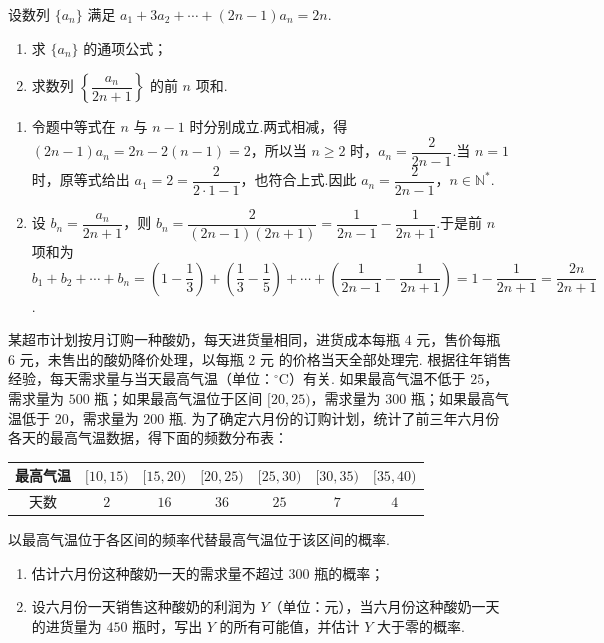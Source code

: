 \begin{problem}
设数列 \(\{a_n\}\) 满足 \(a_1+3a_2+\cdots+(2n-1)a_n=2n\).

\begin{enumerate}
\item 求 \(\{a_n\}\) 的通项公式；
\item 求数列 \(\left\{\dfrac{a_n}{2n+1}\right\}\) 的前 \(n\) 项和.
\end{enumerate}
\end{problem}

\begin{solution}
\begin{enumerate}
\item 令题中等式在 \(n\) 与 \(n-1\) 时分别成立.两式相减，得
\( (2n-1)a_n=2n-2(n-1)=2\)，所以当 \(n\geq2\) 时，\(a_n=\dfrac{2}{2n-1}\).当 \(n=1\) 时，原等式给出 \(a_1=2=\dfrac{2}{2\cdot1-1}\)，也符合上式.因此
\(a_n=\dfrac{2}{2n-1}\)，\(n\in\mathbb N^*\).
\item 设 \(b_n=\dfrac{a_n}{2n+1}\)，则
\(b_n=\dfrac{2}{(2n-1)(2n+1)}=\dfrac{1}{2n-1}-\dfrac{1}{2n+1}\).于是前 \(n\) 项和为
\(b_1+b_2+\cdots+b_n=\left(1-\dfrac13\right)+\left(\dfrac13-\dfrac15\right)+\cdots+\left(\dfrac{1}{2n-1}-\dfrac{1}{2n+1}\right)=1-\dfrac{1}{2n+1}=\dfrac{2n}{2n+1}\).
\end{enumerate}
\end{solution}

\begin{problem}
某超市计划按月订购一种酸奶，每天进货量相同，进货成本每瓶 \(4\text{ 元}\)，售价每瓶 \(6\text{ 元}\)，未售出的酸奶降价处理，以每瓶 \(2\text{ 元}\) 的价格当天全部处理完. 根据往年销售经验，每天需求量与当天最高气温（单位：\(^{\circ}\mathrm{C}\)）有关. 如果最高气温不低于 \(25\)，需求量为 \(500\text{ 瓶}\)；如果最高气温位于区间 \([20,25)\)，需求量为 \(300\text{ 瓶}\)；如果最高气温低于 \(20\)，需求量为 \(200\text{ 瓶}\). 为了确定六月份的订购计划，统计了前三年六月份各天的最高气温数据，得下面的频数分布表：

\begin{center}
\begin{tabular}{c|cccccc}
最高气温 & \([10,15)\) & \([15,20)\) & \([20,25)\) & \([25,30)\) & \([30,35)\) & \([35,40)\) \\
\hline
天数 & \(2\) & \(16\) & \(36\) & \(25\) & \(7\) & \(4\)
\end{tabular}
\end{center}

以最高气温位于各区间的频率代替最高气温位于该区间的概率.

\begin{enumerate}
\item 估计六月份这种酸奶一天的需求量不超过 \(300\) 瓶的概率；
\item 设六月份一天销售这种酸奶的利润为 \(Y\)（单位：元），当六月份这种酸奶一天的进货量为 \(450\) 瓶时，写出 \(Y\) 的所有可能值，并估计 \(Y\) 大于零的概率.
\end{enumerate}
\end{problem}

